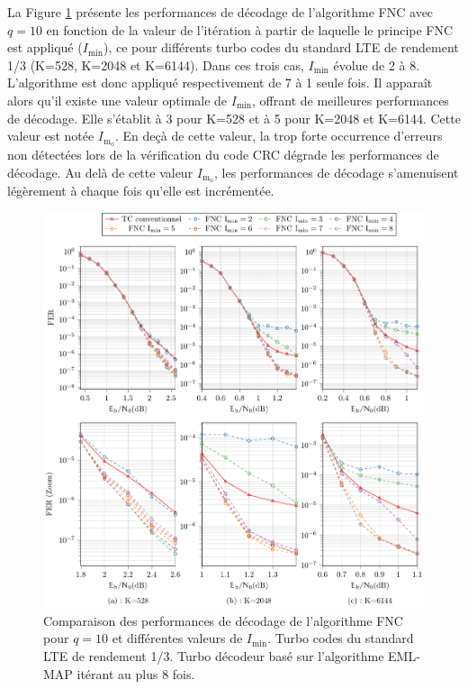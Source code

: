 La Figure \ref{fig:fnc_minX} présente les performances de décodage de l'algorithme FNC avec $q=10$ en fonction de la 
valeur de l'itération à partir de laquelle le principe FNC est appliqué ($I_\text{min}$), ce pour 
différents turbo codes du standard LTE de rendement 1/3 (K=528, K=2048 et K=6144). Dans ces trois cas, $I_\text{min}$ évolue de 2 à 8. L'algorithme est donc 
appliqué respectivement de 7 à 1 seule fois. Il apparaît alors qu'il existe une valeur optimale de 
$I_\text{min}$, offrant de meilleures performances de décodage. Elle s'établit à 3 pour K=528 et à 5 pour 
K=2048 et K=6144. Cette valeur est notée $I_{\text{m}_\text{o}}$. En deçà de cette valeur, la trop forte 
occurrence d'erreurs non détectées lors de la vérification du 
code CRC dégrade les performances de décodage. Au delà de cette valeur $I_{\text{m}_\text{o}}$, les performances de décodage s'amenuisent légèrement à chaque fois qu'elle est incrémentée.

\begin{figure}[!h]
	\centering 
	\hspace*{-.1\textwidth}
	\includegraphics[width=1.12\textwidth]{main/ch4_fig/final/tikz_last/fnc10_minX.pdf}
	\caption{Comparaison des performances de décodage de l'algorithme FNC pour $q=10$ et différentes valeurs de 
	$I_\text{min}$. Turbo codes du standard LTE de rendement 1/3. 
	Turbo décodeur basé sur l'algorithme EML-MAP itérant au plus 8 fois.
	\label{fig:fnc_minX}}
\end{figure}



